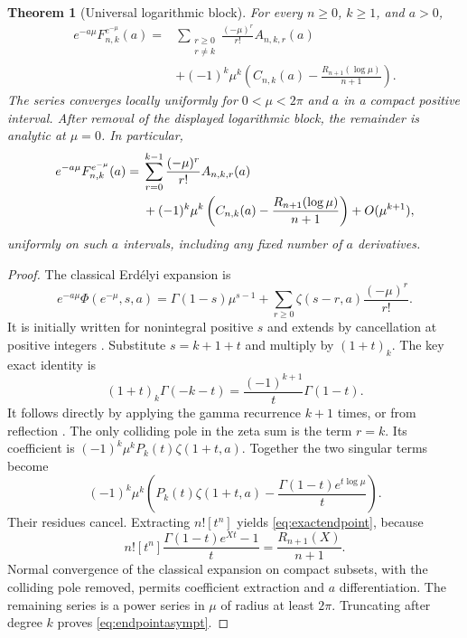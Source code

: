 \documentclass[11pt]{article}
\numberwithin{equation}{section}
\newtheorem{theorem}{Theorem}[section]
\theoremstyle{definition}\newtheorem{definition}[theorem]{Definition}
\theoremstyle{remark}\newtheorem{remark}[theorem]{Remark}
\begin{document}
\begin{theorem}[Universal logarithmic block]\label{thm:endpoint}
For every $n\geq0$, $k\geq1$, and $a>0$,
\begin{equation}\label{eq:exactendpoint}
\boxed{\begin{aligned}
e^{-a\mu}F_{n,k}^{e^{-\mu}}(a)
={}&\sum_{\substack{r\geq0\\r\ne k}}\frac{(-\mu)^r}{r!}A_{n,k,r}(a)\\
&+(-1)^k\mu^k\left(C_{n,k}(a)-\frac{R_{n+1}(\log\mu)}{n+1}\right).
\end{aligned}}
\end{equation}
The series converges locally uniformly for $0<\mu<2\pi$ and $a$ in a compact positive interval. After removal of the displayed logarithmic block, the remainder is analytic at $\mu=0$. In particular,
\begin{align}\label{eq:endpointasympt}
e^{-a\mu}F_{n,k}^{e^{-\mu}}(a)
={}&\sum_{r=0}^{k-1}\frac{(-\mu)^r}{r!}A_{n,k,r}(a)\notag\\
&+(-1)^k\mu^k\left(C_{n,k}(a)-\frac{R_{n+1}(\log\mu)}{n+1}\right)
+O(\mu^{k+1}),
\end{align}
uniformly on such $a$ intervals, including any fixed number of $a$ derivatives.
\end{theorem}
\begin{proof}
The classical Erd\'elyi expansion is
\begin{equation}\label{eq:erdelyi}
e^{-a\mu}\Phi(e^{-\mu},s,a)
=\Gamma(1-s)\mu^{s-1}+\sum_{r\geq0}\zeta(s-r,a)\frac{(-\mu)^r}{r!}.
\end{equation}
It is initially written for nonintegral positive $s$ and extends by cancellation at positive integers \cite{dlmflerch}. Substitute $s=k+1+t$ and multiply by $(1+t)_k$. The key exact identity is
\begin{equation}\label{eq:cancellation}
(1+t)_k\Gamma(-k-t)=\frac{(-1)^{k+1}}{t}\Gamma(1-t).
\end{equation}
It follows directly by applying the gamma recurrence $k+1$ times, or from reflection \cite{dlmfgamma}. The only colliding pole in the zeta sum is the term $r=k$. Its coefficient is $(-1)^k\mu^k P_k(t)\zeta(1+t,a)$. Together the two singular terms become
\[
(-1)^k\mu^k\left(P_k(t)\zeta(1+t,a)-\frac{\Gamma(1-t)e^{t\log\mu}}t\right).
\]
Their residues cancel. Extracting $n![t^n]$ yields \eqref{eq:exactendpoint}, because
\[
n![t^n]\frac{\Gamma(1-t)e^{Xt}-1}{t}=\frac{R_{n+1}(X)}{n+1}.
\]
Normal convergence of the classical expansion on compact subsets, with the colliding pole removed, permits coefficient extraction and $a$ differentiation. The remaining series is a power series in $\mu$ of radius at least $2\pi$. Truncating after degree $k$ proves \eqref{eq:endpointasympt}.
\end{proof}
\end{document}
